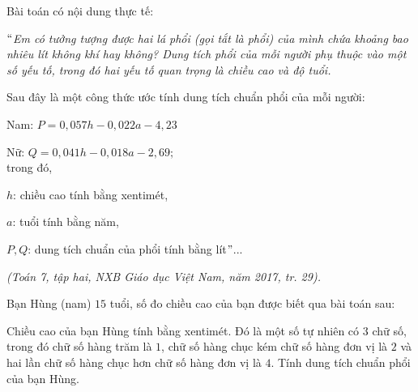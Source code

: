 \begin{bt}%
 Bài toán có nội dung thực tế:
		\par \it $``$Em có tưởng tượng được hai lá phổi (gọi tắt là phổi) của mình chứa khoảng bao nhiêu lít không khí hay không? Dung tích phổi của mỗi người phụ thuộc vào một số yếu tố, trong đó hai yếu tố quan trọng là chiều cao và độ tuổi.
		\par Sau đây là một công thức ước tính dung tích chuẩn phổi của mỗi người:
		\par Nam: $P=0,057h-0,022a-4,23$
		\par Nữ: $Q=0,041h-0,018a-2,69;$\\
		trong đó,
		\par $h$: chiều cao tính bằng xentimét,
		\par $a$: tuổi tính bằng năm,
		\par $P, Q$: dung tích chuẩn của phổi tính bằng lít$"$...
		\begin{flushright}
			\emph{({\it Toán 7}, tập hai, NXB Giáo dục Việt Nam, năm 2017, tr. 29).}
		\end{flushright}
		\rm Bạn Hùng (nam) $15$ tuổi, số đo chiều cao của bạn được biết qua bài toán sau:
		\par Chiều cao của bạn Hùng tính bằng xentimét. Đó là một số tự nhiên có $3$ chữ số, trong đó chữ số hàng trăm là $1$, chữ số hàng chục kém chữ số hàng đơn vị là $2$ và hai lần chữ số hàng chục hơn chữ số hàng đơn vị là $4$. Tính dung tích chuẩn phổi của bạn Hùng.
\end{bt}


